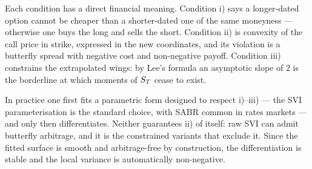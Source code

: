 Each condition has a direct financial meaning. Condition i) says a longer-dated option cannot be 
cheaper than a shorter-dated one of the same moneyness --- otherwise one buys the long and sells the 
short. Condition ii) is convexity of the call price in strike, expressed in the new coordinates, and 
its violation is a butterfly spread with negative cost and non-negative payoff. Condition iii) 
constrains the extrapolated wings: by Lee's formula an asymptotic slope of $2$ is the borderline at
which moments of $S_T$ cease to exist.

In practice one first fits a parametric form designed to respect i)--iii) --- the SVI
parameterisation \cite{gatheral2014} is the standard choice, with SABR common in rates
markets --- and only then differentiates. Neither guarantees ii) of itself: raw SVI can admit
butterfly arbitrage, and it is the constrained variants that exclude it. Since the fitted surface is smooth and arbitrage-free by construction, the 
differentiation is stable and the local variance is automatically non-negative.




